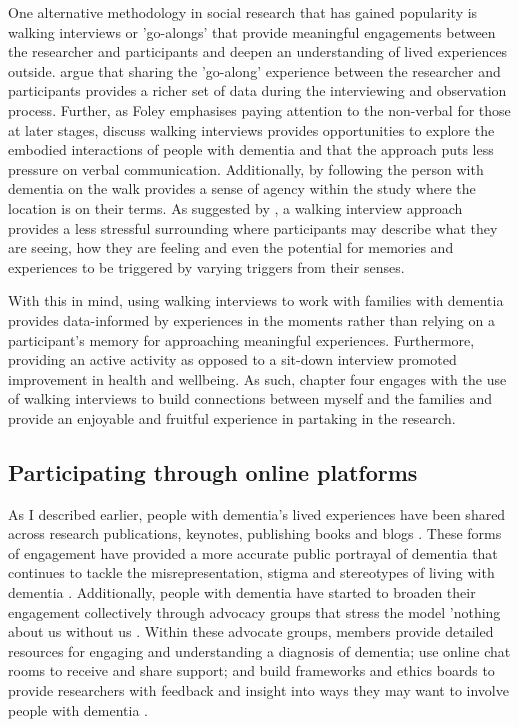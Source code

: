 One alternative methodology in social research that has gained popularity is walking interviews or 'go-alongs' that provide meaningful engagements between the researcher and participants and deepen an understanding of lived experiences outside. \cite{hein2008mobile} argue that sharing the 'go-along' experience between the researcher and participants provides a richer set of data during the interviewing and observation process. Further, as Foley emphasises paying attention to the non-verbal for those at later stages, \cite{kullberg2017walking} discuss walking interviews provides opportunities to explore the embodied interactions of people with dementia and that the approach puts less pressure on verbal communication. Additionally, by following the person with dementia on the walk provides a sense of agency within the study where the location is on their terms. As suggested by \cite{kullberg2017walking}, a walking interview approach provides a less stressful surrounding where participants may describe what they are seeing, how they are feeling and even the potential for memories and experiences to be triggered by varying triggers from their senses.

With this in mind, using walking interviews to work with families with dementia provides data-informed by experiences in the moments rather than relying on a participant's memory for approaching meaningful experiences. Furthermore, providing an active activity as opposed to a sit-down interview promoted improvement in health and wellbeing. As such, chapter four engages with the use of walking interviews to build connections between myself and the families and provide an enjoyable and fruitful experience in partaking in the research. 

\subsection{Participating through online platforms}
\label{PD:onlinePlatform}
As I described earlier, people with dementia's lived experiences have been shared across research publications, keynotes, publishing books and blogs \citep{bryden_challenging_2020, shakespeare_rights_2019}. These forms of engagement have provided a more accurate public portrayal of dementia that continues to tackle the misrepresentation, stigma and stereotypes of living with dementia \citep{herrmann_systematic_2018}. Additionally, people with dementia have started to broaden their engagement collectively through advocacy groups that stress the model 'nothing about us without us \citep{oldfield2021nothing}. Within these advocate groups, members provide detailed resources for engaging and understanding a diagnosis of dementia; use online chat rooms to receive and share support; and build frameworks and ethics boards to provide researchers with feedback and insight into ways they may want to involve people with dementia \citep{diaries_deep_2020}. 

